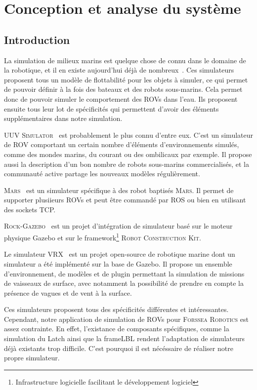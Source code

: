\chapter{Conception et analyse du système}

    \section{Introduction}

        La simulation de milieux marins est quelque chose de connu dans le domaine de la robotique, et il en existe aujourd'hui déjà de nombreux~\cite{Manhaes_2016, bingham19toward, MARS, Rock}. Ces simulateurs proposent tous un modèle de flottabilité pour les objets à simuler, ce qui permet de pouvoir définir à la fois des bateaux et des robots sous-marins. Cela permet donc de pouvoir simuler le comportement des \gls{ROV}s dans l'eau. Ils proposent ensuite tous leur lot de spécificités qui permettent d'avoir des éléments supplémentaires dans notre simulation.
        
        \textsc{UUV Simulator}~\cite{Manhaes_2016} est probablement le plus connu d'entre eux. C'est un simulateur de \gls{ROV} comportant un certain nombre d'éléments d'environnements simulés, comme des mondes marins, du courant ou des ombilicaux par exemple. Il propose aussi la description d'un bon nombre de robots sous-marins commercialisés, et la communauté active partage les nouveaux modèles régulièrement.
        
        \textsc{Mars}~\cite{MARS} est un simulateur spécifique à des robot baptisés \textsc{Mars}. Il permet de supporter plusiieurs \gls{ROV}s et peut être commandé par \gls{ROS} ou bien en utilisant des sockets TCP.
        
        \textsc{Rock-Gazebo}~\cite{Rock} est un projet d'intégration de simulateur basé sur le moteur physique \gls{Gazebo} et sur le framework\footnote{Infrastructure logicielle facilitant le développement logiciel} \textsc{Robot Construction Kit}.
        
        Le simulateur \textsc{VRX}~\cite{bingham19toward} est un projet open-source de robotique marine dont un simulateur a été implémenté sur la base de \gls{Gazebo}. Il propose un ensemble d'environnement, de modèles et de plugin permettant la simulation de missions de vaisseaux de surface, avec notamment la possibilité de prendre en compte la présence de vagues et de vent à la surface.

        Ces simulateurs proposent tous des spécificités différentes et intéressantes. Cependant, notre application de simulation de \gls{ROV}s pour \textsc{Forssea Robotics} est assez contrainte. En effet, l'existance de composants spécifiques, comme la simulation du \gls{Latch} ainsi que la \gls{frameLBL} rendent l'adaptation de simulateurs déjà existants trop difficile. C'est pourquoi il est nécéssaire de réaliser notre propre simulateur.

